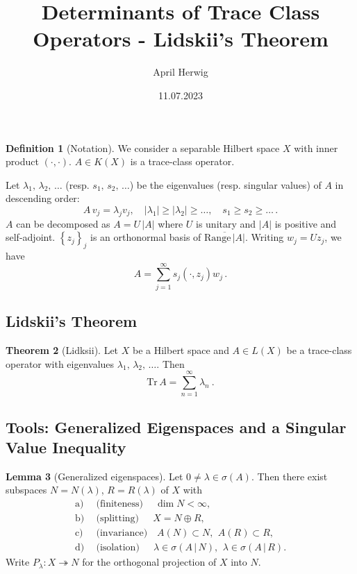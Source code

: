 \documentclass[a4paper]{article}
\title{\vspace*{-5ex}Determinants of Trace Class Operators - Lidskii's Theorem}
\author{\vspace*{-15ex}April Herwig}
\date{11.07.2023}
\newcommand{\Tr}{\textrm{Tr}\,}
\newcommand{\ran}{\textrm{Range}\,}
\theoremstyle{definition}
\newtheorem{definition}{Definition}[section]
\newtheorem{theorem}[definition]{Theorem}
\newtheorem{lemma}[definition]{Lemma}
\theoremstyle{remark}
\theoremstyle{remark}
\begin{document}
\maketitle

\begin{definition}[Notation]
    We consider a separable Hilbert space $X$ with inner product $(\cdot, \cdot)$. $A \in K(X)$ is a trace-class operator. 

    Let $\lambda_1,\, \lambda_2,\, \ldots$ (resp. $s_1,\, s_2,\, \ldots$) be the eigenvalues (resp. singular values) of $A$ in descending order:
    \begin{equation}
        A\, v_j = \lambda_j v_j, \quad |\lambda_1| \geq |\lambda_2| \geq \ldots, \quad s_1 \geq s_2 \geq \ldots\, .
    \end{equation}
    $A$ can be decomposed as $A = U\, |A|$ where $U$ is unitary and $|A|$ is positive and self-adjoint. $\left\{ z_j \right\}_j$ is an orthonormal basis of $\overline{\ran |A|}$. Writing $w_j = U z_j$, we have
    \begin{equation}
        A = \sum_{j=1}^\infty s_j (\cdot, z_j) w_j \,. 
    \end{equation}
\end{definition}

\subsection{Lidskii's Theorem}

\begin{theorem}[Lidksii]
    \label{lidskii}
    Let $X$ be a Hilbert space and $A \in L(X)$ be a trace-class operator with eigenvalues $\lambda_1,\, \lambda_2,\, \ldots$. Then 
    \begin{equation}
        \Tr A = \sum_{n=1}^{\infty} \lambda_n\ . 
    \end{equation}
\end{theorem}

\subsection{Tools: Generalized Eigenspaces and a Singular Value Inequality}

\begin{lemma}[Generalized eigenspaces]
    Let $0 \neq \lambda \in \sigma (A)$. Then there exist subspaces $N = N(\lambda)$, $R = R(\lambda)$ of $X$ with
    \begin{align}
        \text{a)}\ &\ \text{(finiteness)} \quad\ \dim N < \infty, \\
        \text{b)}\ &\ \text{(splitting)} \quad\ \ X = N \oplus R, \\
        \text{c)}\ &\ \text{(invariance)} \quad A(N) \subset N,\,\ A(R) \subset R, \\
        \text{d)}\ &\ \text{(isolation)} \quad\ \ \lambda \in \sigma (A \,\vert\, N),\,\ \lambda \in \sigma (A \,\vert\, R). 
    \end{align}
    Write $P_\lambda : X \twoheadrightarrow N$ for the orthogonal projection of $X$ into $N$. 
\end{lemma}
\end{document}

